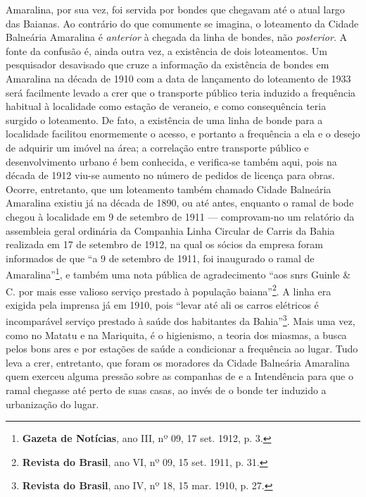 Amaralina, por sua vez, foi servida por bondes que chegavam até o atual largo das Baianas. Ao contrário do que comumente se imagina, o loteamento da Cidade Balneária Amaralina é \textit{anterior} à chegada da linha de bondes, não \textit{posterior}. A fonte da confusão é, ainda outra vez, a existência de dois loteamentos. Um pesquisador desavisado que cruze a informação da existência de bondes em Amaralina na década de 1910 com a data de lançamento do loteamento de 1933 será facilmente levado a crer que o transporte público teria induzido a frequência habitual à localidade como estação de veraneio, e como consequência teria surgido o loteamento. De fato, a existência de uma linha de bonde para a localidade facilitou enormemente o acesso, e portanto a frequência a ela e o desejo de adquirir um imóvel na área; a correlação entre transporte público e desenvolvimento urbano é bem conhecida, e verifica-se também aqui, pois na década de 1912 viu-se aumento no número de pedidos de licença para obras. Ocorre, entretanto, que um loteamento também chamado Cidade Balneária Amaralina existiu já na década de 1890, ou até antes, enquanto o ramal de bode chegou à localidade em 9 de setembro de 1911 --- comprovam-no um relatório da assembleia geral ordinária da Companhia Linha Circular de Carris da Bahia realizada em 17 de setembro de 1912, na qual os sócios da empresa foram informados de que ``a 9 de setembro de 1911, foi inaugurado o ramal de Amaralina''\footnote{\textbf{Gazeta de Notícias}, ano III, nº 09, 17 set. 1912, p. 3.}, e também uma nota pública de agradecimento ``aos snrs Guinle \& C. por mais esse valioso serviço prestado à população baiana''\footnote{\textbf{Revista do Brasil}, ano VI, nº 09, 15 set. 1911, p. 31.}. A linha era exigida pela imprensa já em 1910, pois ``levar até ali os carros elétricos é incomparável serviço prestado à saúde dos habitantes da Bahia''\footnote{\textbf{Revista do Brasil}, ano IV, nº 18, 15 mar. 1910, p. 27.}. Mais uma vez, como no Matatu e na Mariquita, é o higienismo, a teoria dos miasmas, a busca pelos bons ares e por estações de saúde a condicionar a frequência ao lugar. Tudo leva a crer, entretanto, que foram os moradores da Cidade Balneária Amaralina quem exerceu alguma pressão sobre as companhas de  e a Intendência para que o ramal chegasse até perto de suas casas, ao invés de o bonde ter induzido a urbanização do lugar.

